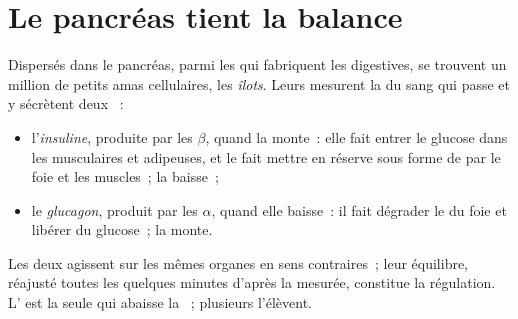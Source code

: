\section{Le pancréas tient la balance}

\begin{proposition}\label{prop:g12:glucose-and-diabetes:hormones}
Dispersés dans le pancréas, parmi les  qui fabriquent les
 digestives, se trouvent un million de petits amas cellulaires,
les \emph{îlots}. Leurs  mesurent la
 du sang qui passe et y sécrètent deux ~:
\begin{itemize}
  \item l'\emph{insuline}, produite par les 
        $\beta$, quand la  monte~: elle fait entrer le glucose
        dans les  musculaires et adipeuses, et le fait mettre
        en réserve sous forme de  par le foie et les
        muscles~; la  baisse~;
  \item le \emph{glucagon}, produit par les 
        $\alpha$, quand elle baisse~: il fait dégrader le  du
        foie et libérer du glucose~; la  monte.
\end{itemize}
Les deux agissent sur les mêmes organes en sens contraires~; leur
équilibre, réajusté toutes les quelques minutes d'après la 
mesurée, constitue la régulation. L' est la seule  qui
abaisse la ~; plusieurs l'élèvent.
\end{proposition}
